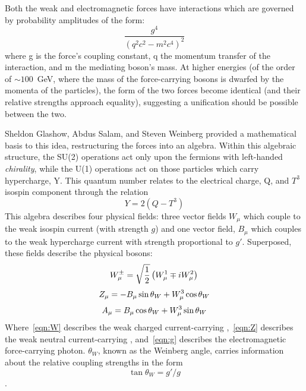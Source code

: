 Both the weak and electromagnetic forces have interactions which are governed 
by probability amplitudes of the form:
\begin{equation*}
    \frac{g^4}{\left(q^2c^2-m^2c^4\right)^2}
\end{equation*}
where g is the force's coupling constant, q the momentum transfer of the
interaction, and m the mediating boson's mass. At higher energies (of the order
of $\sim100$~GeV, where the mass of the force-carrying bosons is dwarfed by the
momenta of the particles), the form of the two forces become identical (and
their relative strengths approach equality), suggesting a unification should be
possible between the two.

Sheldon Glashow, Abdus Salam, and Steven Weinberg \cite{Glashow:1961wk} provided
a mathematical basis to this idea, restructuring the forces into an \ewk
algebra.  Within this algebraic structure, the SU(2) operations act only upon
the fermions with left-handed \emph{chirality}, while the U(1) operations act on
those particles which carry hypercharge, Y. This quantum number relates to the
electrical charge, Q, and $T^3$ isospin component through the relation
\begin{equation*}
    Y = 2(Q-T^3)
\end{equation*}
This \ewk algebra describes four physical fields: three vector fields $W_\mu$ which couple to
the weak isospin current (with strength $g$) and one vector field, $B_\mu$ which
couples to the weak hypercharge current with strength proportional to $g'$.
Superposed, these fields describe the physical bosons:
\begin{equation}
\label{eqn:W}
    W_\mu^\pm = \sqrt{\frac{1}{2}}\left(W_\mu^1 \mp i W_\mu^2 \right) \\
\end{equation}
\begin{equation}
\label{eqn:Z}
    Z_\mu = -B_\mu \sin \theta_W + W_\mu^3 \cos \theta_W \\
\end{equation}
\begin{equation}
\label{eqn:g}
    A_\mu = B_\mu \cos \theta_W + W_\mu^3 \sin \theta_W \\
\end{equation}
Where~\ref{eqn:W} describes the weak charged current-carrying \W,~\ref{eqn:Z}
describes the weak neutral current-carrying \Z, and~\ref{eqn:g} describes the
electromagnetic force-carrying photon. $\theta_W$, known as the Weinberg angle,
carries information about the relative coupling strengths in the form
\begin{equation}
    \tan \theta_W = g'/g
\end{equation}.

